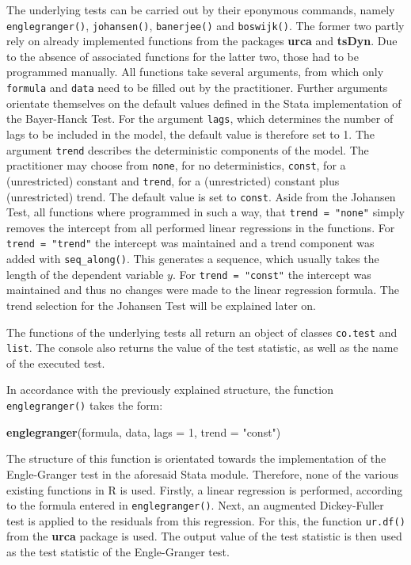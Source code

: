 \documentclass[11.5pt,a4paper]{article}
\newenvironment{Shaded}{\begin{snugshade}}{\end{snugshade}}
\newcommand{\DataTypeTok}[1]{\textcolor[rgb]{0.13,0.29,0.53}{#1}}
\newcommand{\DecValTok}[1]{\textcolor[rgb]{0.00,0.00,0.81}{#1}}
\newcommand{\KeywordTok}[1]{\textcolor[rgb]{0.13,0.29,0.53}{\textbf{#1}}}
\newcommand{\NormalTok}[1]{#1}
\newcommand{\StringTok}[1]{\textcolor[rgb]{0.31,0.60,0.02}{#1}}
\begin{document}
The underlying tests can be carried out by their eponymous commands,
namely \texttt{englegranger()}, \texttt{johansen()}, \texttt{banerjee()}
and \texttt{boswijk()}. The former two partly rely on already
implemented functions from the packages \textbf{urca} and
\textbf{tsDyn}. Due to the absence of associated functions for the
latter two, those had to be programmed manually. All functions take
several arguments, from which only \texttt{formula} and \texttt{data}
need to be filled out by the practitioner. Further arguments orientate
themselves on the default values defined in the Stata implementation of
the Bayer-Hanck Test. For the argument \texttt{lags}, which determines
the number of lags to be included in the model, the default value is
therefore set to 1. The argument \texttt{trend} describes the
deterministic components of the model. The practitioner may choose from
\texttt{none}, for no deterministics, \texttt{const}, for a
(unrestricted) constant and \texttt{trend}, for a (unrestricted)
constant plus (unrestricted) trend. The default value is set to
\texttt{const}. Aside from the Johansen Test, all functions where
programmed in such a way, that \texttt{trend\ =\ "none"} simply removes
the intercept from all performed linear regressions in the functions.
For \texttt{trend\ =\ "trend"} the intercept was maintained and a trend
component was added with \texttt{seq\_along()}. This generates a
sequence, which usually takes the length of the dependent variable
\(y\). For \texttt{trend\ =\ "const"} the intercept was maintained and
thus no changes were made to the linear regression formula. The trend
selection for the Johansen Test will be explained later on.

The functions of the underlying tests all return an object of classes
\texttt{co.test} and \texttt{list}. The console also returns the value
of the test statistic, as well as the name of the executed test.

In accordance with the previously explained structure, the function
\texttt{englegranger()} takes the form:

\begin{Shaded}
\begin{Highlighting}[]
\KeywordTok{englegranger}\NormalTok{(formula, data, }\DataTypeTok{lags =} \DecValTok{1}\NormalTok{, }\DataTypeTok{trend =} \StringTok{"const"}\NormalTok{)}
\end{Highlighting}
\end{Shaded}

The structure of this function is orientated towards the implementation
of the Engle-Granger test in the aforesaid Stata module. Therefore, none
of the various existing functions in R is used. Firstly, a linear
regression is performed, according to the formula entered in
\texttt{englegranger()}. Next, an augmented Dickey-Fuller test is
applied to the residuals from this regression. For this, the function
\texttt{ur.df()} from the \textbf{urca} package is used. The output
value of the test statistic is then used as the test statistic of the
Engle-Granger test.
\end{document}
